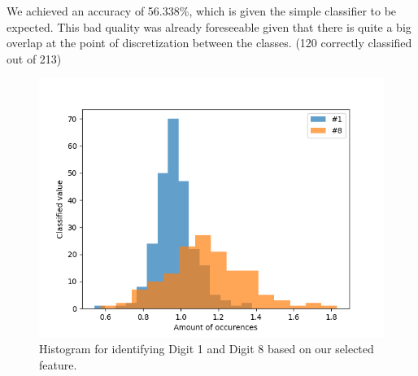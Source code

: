 \documentclass{article}
\begin{document}
We achieved an accuracy of 56.338\%, which is given the simple classifier to be expected. This bad quality was already foreseeable given that there is quite a big overlap at the point of discretization between the classes. (120 correctly classified out of 213)
\begin{figure}[H]
\centering
\includegraphics[width=0.9\linewidth]{img/histogram.png}
\caption{Histogram for identifying Digit 1 and Digit 8 based on our selected feature.}
\label{fig:histogram}
\end{figure}
\end{document}

